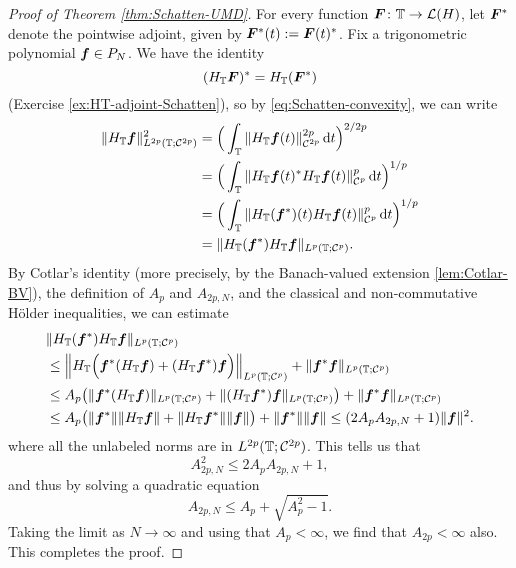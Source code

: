 \begin{proof}[Proof of Theorem \ref{thm:Schatten-UMD}]
  For every function $\bm{F} \colon \mathbb{T} \to \mathcal{L}(H)$, let $\bm{F}^*$ denote the pointwise adjoint, given by $\bm{F}^{*}(t) := \bm{F}(t)^*$.
  Fix a trigonometric polynomial $\bm{f} \in P_{N}$.
  We have the identity
  \begin{equation*}
    (H_{\mathbb{T}} \bm{F})^{*} = H_{\mathbb{T}} (\bm{F}^*)
  \end{equation*}
  (Exercise \ref{ex:HT-adjoint-Schatten}), so by \eqref{eq:Schatten-convexity}, we can write
  \begin{equation*}
    \begin{aligned}
      \|H_{\mathbb{T}} \bm{f}\|_{L^{2p}(\mathbb{T};\mathcal{C}^{2p})}^{2}
      &= \Big( \int_{\mathbb{T}} \|H_{\mathbb{T}} \bm{f}(t) \|_{\mathcal{C}^{2p}}^{2p} \, \mathrm{d} t \Big)^{2/2p} \\
      &= \Big( \int_{\mathbb{T}} \|H_{\mathbb{T}} \bm{f}(t)^* H_{\mathbb{T}} \bm{f}(t) \|_{\mathcal{C}^{p}}^{p} \, \mathrm{d} t \Big)^{1/p} \\
      &= \Big( \int_{\mathbb{T}} \|H_{\mathbb{T}} (\bm{f}^{*})(t) H_{\mathbb{T}} \bm{f}(t) \|_{\mathcal{C}^{p}}^{p} \, \mathrm{d} t \Big)^{1/p} \\
      &= \|H_{\mathbb{T}} (\bm{f}^*) H_{\mathbb{T}} \bm{f}\|_{L^p(\mathbb{T};\mathcal{C}^{p})}.
    \end{aligned}
  \end{equation*}
  By Cotlar's identity (more precisely, by the Banach-valued extension \eqref{lem:Cotlar-BV}), the definition of $A_{p}$ and $A_{2p,N}$, and the classical and non-commutative H\"older inequalities, we can estimate
  \begin{equation*}
    \begin{aligned}
      &\|H_{\mathbb{T}} (\bm{f}^*) H_{\mathbb{T}} \bm{f}\|_{L^p(\mathbb{T};\mathcal{C}^{p})} \\
      &\leq \Big\|H_{\mathbb{T}}\Big(\bm{f}^* (H_{\mathbb{T}} \bm{f}) + (H_{\mathbb{T}} \bm{f}^*)\bm{f} \Big) \Big\|_{L^p(\mathbb{T};\mathcal{C}^{p})} + \|\bm{f}^{*} \bm{f}\|_{L^p(\mathbb{T};\mathcal{C}^{p})} \\
      &\leq A_{p} \big( \|\bm{f}^* (H_{\mathbb{T}} \bm{f})\|_{L^p(\mathbb{T};\mathcal{C}^{p})} + \| (H_{\mathbb{T}} \bm{f}^*)\bm{f} \|_{L^p(\mathbb{T};\mathcal{C}^{p})} \big) + \|\bm{f}^{*} \bm{f}\|_{L^p(\mathbb{T};\mathcal{C}^{p})} \\
      &\leq A_{p} \big( \|\bm{f}^*\| \|H_{\mathbb{T}} \bm{f}\| + \| H_{\mathbb{T}} \bm{f}^*\| \| \bm{f} \| \big)   + \|\bm{f}^{*}\| \| \bm{f}\| 
      \leq (2A_{p} A_{2p,N} + 1) \|\bm{f}\|^{2}.
    \end{aligned}
  \end{equation*}
  where all the unlabeled norms are in $L^{2p}(\mathbb{T};\mathcal{C}^{2p})$.
  This tells us that
  \begin{equation*}
    A_{2p,N}^{2} \leq 2A_{p} A_{2p,N} + 1,
  \end{equation*}
  and thus by solving a quadratic equation
  \begin{equation*}
    A_{2p,N} \leq A_{p} + \sqrt{A_{p}^{2} - 1}.
  \end{equation*}
  Taking the limit as $N \to \infty$ and using that $A_{p} < \infty$, we find that $A_{2p} < \infty$ also.
  This completes the proof.
\end{proof}

